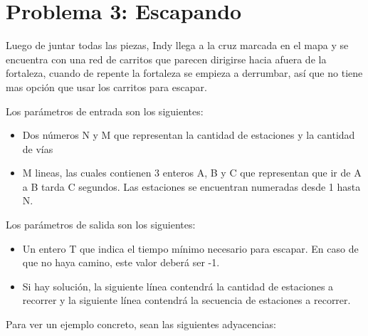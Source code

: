 \section{Problema 3: Escapando}

Luego de juntar todas las piezas, Indy llega a la cruz marcada en el mapa y se encuentra con una red de carritos que parecen dirigirse hacia afuera de la fortaleza, cuando de repente la fortaleza se empieza a derrumbar, así que no tiene mas opción que usar los carritos para escapar.

Los parámetros de entrada son los siguientes:

        \begin{itemize}
        \item Dos números N y M que representan la cantidad de estaciones y la cantidad de vías
        \item M lineas, las cuales contienen 3 enteros A, B y C que representan que ir de A a B tarda C segundos. Las estaciones se encuentran numeradas desde 1 hasta N.
        \end{itemize}

Los parámetros de salida son los siguientes:

    \begin{itemize}
    \item Un entero T que indica el tiempo mínimo necesario para escapar. En caso de que no haya camino, este valor deberá ser -1.
    \item Si hay solución, la siguiente línea contendrá la cantidad de estaciones a recorrer y la siguiente línea contendrá la secuencia de estaciones a recorrer.
    \end{itemize}

Para ver un ejemplo concreto, sean las siguientes adyacencias:

\begin{center}
\end{center}


